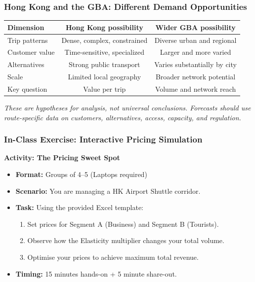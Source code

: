 \documentclass{beamer}
\begin{document}
\begin{frame}[t]
\frametitle{Hong Kong and the GBA: Different Demand Opportunities}
\begin{center}\small
\begin{tabular}{l|cc}
\textbf{Dimension} & \textbf{Hong Kong possibility} & \textbf{Wider GBA possibility}\\
\hline
Trip patterns & Dense, complex, constrained & Diverse urban and regional\\
Customer value & Time-sensitive, specialized & Larger and more varied\\
Alternatives & Strong public transport & Varies substantially by city\\
Scale & Limited local geography & Broader network potential\\
Key question & Value per trip & Volume and network reach\\
\end{tabular}
\end{center}
\vspace{0.3cm}
\textit{These are hypotheses for analysis, not universal conclusions. Forecasts should use route-specific data on customers, alternatives, access, capacity, and regulation.}
\end{frame}


\begin{frame}[t]
  \frametitle{In-Class Exercise: Interactive Pricing Simulation}
  
  \textbf{Activity: The Pricing Sweet Spot}
  \begin{itemize}
    \item \textbf{Format:} Groups of 4–5 (Laptops required)
    \item \textbf{Scenario:} You are managing a HK Airport Shuttle corridor.
    \item \textbf{Task:} Using the provided Excel template:
    \begin{enumerate}
        \item Set prices for Segment A (Business) and Segment B (Tourists).
        \item Observe how the Elasticity multiplier changes your total volume.
        \item Optimise your prices to achieve maximum total revenue.
    \end{enumerate}
    \item \textbf{Timing:} 15 minutes hands-on + 5 minute share-out.
  \end{itemize}
\end{frame}
\end{document}
